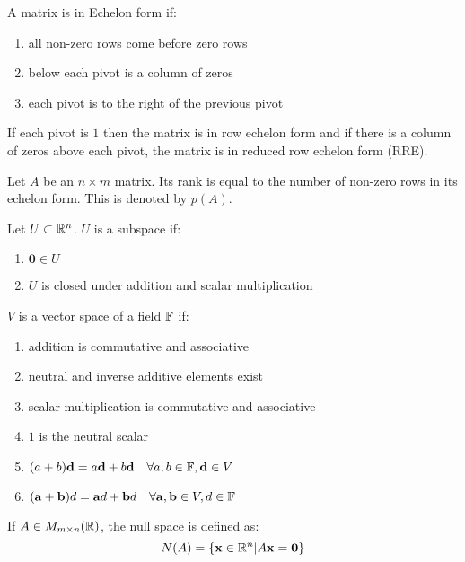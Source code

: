 \documentclass[a4paper,10pt]{article}
\begin{document}
\begin{defn}
	A matrix is in Echelon form if:
	\begin{enumerate}
		\item all non-zero rows come before zero rows
		\item below each pivot is a column of zeros
		\item each pivot is to the right of the previous pivot
	\end{enumerate}

	If each pivot is $1$ then the matrix is in row echelon form and if
	there is a column of zeros above each pivot, the matrix is in reduced
	row echelon form (RRE).
\end{defn}

\begin{defn}[Rank]
	Let $A$ be an $n \times m$ matrix. Its rank is equal to the number of
	non-zero rows in its echelon form. This is denoted by $p(A)$.
\end{defn}

\begin{defn}[Subspace]
	Let $U \subset \mathbb{R}^n$. $U$ is a subspace if:
	\begin{enumerate}
		\item $\mathbf{0} \in U$
		\item $U$ is closed under addition and scalar multiplication
	\end{enumerate}
\end{defn}

\begin{defn}
	$V$ is a vector space of a field $\mathbb{F}$ if:
	\begin{enumerate}
		\item addition is commutative and associative
		\item neutral and inverse additive elements exist
		\item scalar multiplication is commutative and associative
		\item $1$ is the neutral scalar
		\item $(a+b)\mathbf{d} = a\mathbf{d} + b\mathbf{d} \quad \forall a,b \in \mathbb{F}, \mathbf{d} \in V$
		\item $(\mathbf{a} + \mathbf{b})d = \mathbf{a}d + \mathbf{b}d \quad \forall \mathbf{a},\mathbf{b} \in V, d \in \mathbb{F}$
	\end{enumerate}
\end{defn}

\begin{defn}
	If $A \in M_{m \times n}(\mathbb{R})$, the null space is defined as:
	\[
		N(A) = \{ \mathbf{x} \in \mathbb{R}^n | A\mathbf{x} = \mathbf{0} \}
	\]
\end{defn}
\end{document}
